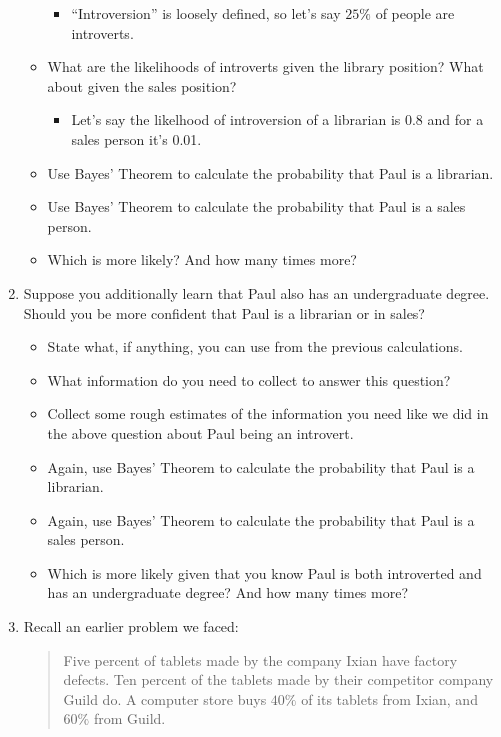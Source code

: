 \documentclass[]{tufte-book}
\providecommand{\tightlist}{%
  \setlength{\itemsep}{0pt}\setlength{\parskip}{0pt}}
\begin{document}
\begin{enumerate}
\begin{itemize}
    \begin{itemize}
    \tightlist
    \item
      ``Introversion'' is loosely defined, so let's say \(25\%\) of people are introverts.
    \end{itemize}
  \item
    What are the likelihoods of introverts given the library position? What about given the sales position?

    \begin{itemize}
    \tightlist
    \item
      Let's say the likelhood of introversion of a librarian is 0.8 and for a sales person it's 0.01.
    \end{itemize}
  \item
    Use Bayes' Theorem to calculate the probability that Paul is a librarian.
  \item
    Use Bayes' Theorem to calculate the probability that Paul is a sales person.
  \item
    Which is more likely? And how many times more?
  \end{itemize}
\item
  Suppose you additionally learn that Paul also has an undergraduate degree. Should you be more confident that Paul is a librarian or in sales?

  \begin{itemize}
  \tightlist
  \item
    State what, if anything, you can use from the previous calculations.
  \item
    What information do you need to collect to answer this question?
  \item
    Collect some rough estimates of the information you need like we did in the above question about Paul being an introvert.
  \item
    Again, use Bayes' Theorem to calculate the probability that Paul is a librarian.
  \item
    Again, use Bayes' Theorem to calculate the probability that Paul is a sales person.
  \item
    Which is more likely given that you know Paul is both introverted and has an undergraduate degree? And how many times more?
  \end{itemize}
\item
  Recall an earlier problem we faced:

  \begin{quote}
  Five percent of tablets made by the company Ixian have factory defects. Ten percent of the tablets made by their competitor company Guild do. A computer store buys \(40\%\) of its tablets from Ixian, and \(60\%\) from Guild.
  \end{quote}


\end{enumerate}
\end{document}
